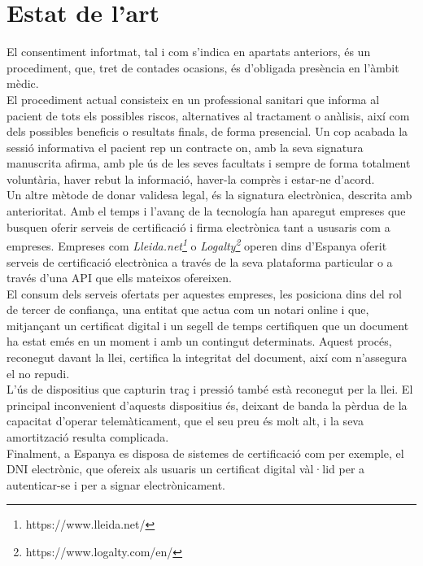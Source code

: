 \section{Estat de l'art}
El consentiment infortmat, tal i com s'indica en apartats anteriors, és un procediment, que, tret de contades ocasions, és d'obligada presència en l'àmbit mèdic.\\
\newline El procediment actual consisteix en un professional sanitari que informa al pacient de tots els possibles riscos, alternatives al tractament o anàlisis, així com dels possibles beneficis o resultats finals, de forma presencial. Un cop acabada la sessió informativa el pacient rep un contracte on, amb la seva signatura manuscrita afirma, amb ple ús de les seves facultats i sempre de forma totalment voluntària, haver rebut la informació, haver-la comprès i estar-ne d'acord.\\
\newline Un altre mètode de donar validesa legal, és la signatura electrònica, descrita amb anterioritat. Amb el temps i l'avanç de la tecnología han aparegut empreses que busquen oferir serveis de certificació i firma electrònica tant a ususaris com a empreses.
\newline Empreses com \textit{Lleida.net\footnote{https://www.lleida.net/}} o \textit{Logalty\footnote{https://www.logalty.com/en/}} operen dins d'Espanya oferit serveis de certificació electrònica a través de la seva plataforma particular o a través d'una API que ells mateixos ofereixen.\\
\newline El consum dels serveis ofertats per aquestes empreses, les posiciona dins del rol de tercer de confiança, una entitat que actua com un notari online i que, mitjançant un certificat digital i un segell de temps certifiquen que un document ha estat emés en un moment i amb un contingut determinats. 
\newline Aquest procés, reconegut davant la llei, certifica la integritat del document, així com n'assegura el no repudi.\\
\newline L'ús de dispositius que capturin traç i pressió també està reconegut per la llei. El principal inconvenient d'aquests dispositius és, deixant de banda la pèrdua de la capacitat d'operar telemàticament, que el seu preu és molt alt, i la seva amortització resulta complicada.\\
\newline Finalment, a Espanya es disposa de sistemes de certificació com per exemple, el DNI electrònic, que ofereix als usuaris un certificat digital vàl·lid per a autenticar-se i per a signar electrònicament.

